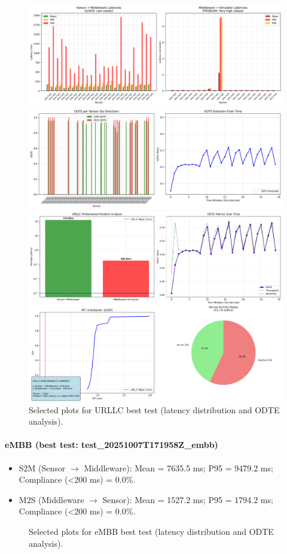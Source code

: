 \begin{figure}[ht]
  \centering
  
    \includegraphics[width=0.45\linewidth]{ article/plots/urllc/urllc_latency_comparison.png }
  
    \includegraphics[width=0.45\linewidth]{ article/plots/urllc/urllc_odte_analysis.png }
  
    \includegraphics[width=0.45\linewidth]{ article/plots/urllc/urllc_problem_analysis.png }
  
  \caption{Selected plots for URLLC best test (latency distribution and ODTE analysis).}
\end{figure}

\paragraph{eMBB (best test: test_20251007T171958Z_embb)}
\begin{itemize}
  \item S2M (Sensor $\rightarrow$ Middleware): Mean = 7635.5 ms; P95 = 9479.2 ms; Compliance (<200 ms) = 0.0\%.
  \item M2S (Middleware $\rightarrow$ Sensor): Mean = 1527.2 ms; P95 = 1794.2 ms; Compliance (<200 ms) = 0.0\%.
\end{itemize}

\begin{figure}[ht]
  \centering
  
  \caption{Selected plots for eMBB best test (latency distribution and ODTE analysis).}
\end{figure}

